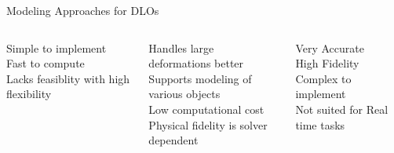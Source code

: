 \documentclass[aspectratio=169]{beamer}
\begin{document}
\begin{frame}{Modeling Approaches for DLOs}
  \begin{columns}[T]

    \begin{column}{0.31\textwidth}
      \begin{tcolorbox}[colback=lightblue!60, colframe=mainblue,
                        title={\small Mass-Spring System (MSS)},
                        fonttitle=\bfseries\small, coltitle=white,
                        arc=4pt, boxrule=0.8pt]
        \small
        \checkmark  \quad Simple to implement \\[4pt]
        \checkmark  \quad Fast to compute \\[4pt]
         \quad Lacks feasiblity with high flexibility \\[4pt]

      \end{tcolorbox}
    \end{column}

    \begin{column}{0.31\textwidth}
      \begin{tcolorbox}[colback=lightblue!60, colframe=mainblue,
                        title={\small Extended Pos.-Based Dynamics (XPBD)},
                        fonttitle=\bfseries\small, coltitle=white,
                        arc=4pt, boxrule=0.8pt]
        \small
        \checkmark  \quad Handles large deformations better \\[4pt]
        \checkmark  \quad Supports modeling of various objects\\[4pt]
        \checkmark  \quad Low computational cost \\[4pt]
           \quad Physical fidelity is solver dependent\\[4pt]
      \end{tcolorbox}
    \end{column}

    \begin{column}{0.31\textwidth}
      \begin{tcolorbox}[colback=accentblue!25, colframe=gray!60,
                        title={\small Finite Element Analysis (FEM)},
                        fonttitle=\bfseries\small, coltitle=black,
                        arc=4pt, boxrule=1.2pt]
        \small
        \checkmark  \quad Very Accurate \\[4pt]
        \checkmark  \quad High Fidelity\\[4pt]
         \quad Complex to implement \\[4pt]
         \quad Not suited for Real time tasks \\[4pt]
      \end{tcolorbox}
    \end{column}

  \end{columns}

\end{frame}
\end{document}
